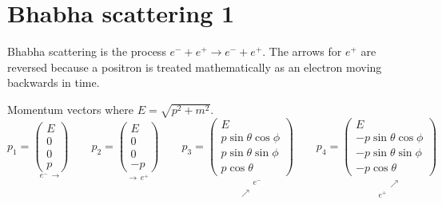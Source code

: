

\section*{Bhabha scattering 1}

Bhabha scattering is the process $e^-+e^+\rightarrow e^-+e^+$.
The arrows for $e^+$ are reversed because a positron is treated
mathematically as an electron moving backwards in time.

\begin{center}
\end{center}

Momentum vectors where $E=\sqrt{p^2+m^2}$.
\begin{equation*}
p_1=\underset{e^- \, \longrightarrow}
{\begin{pmatrix}E\\0\\0\\p\end{pmatrix}}
\qquad
p_2=\underset{\longrightarrow \, e^+}
{\begin{pmatrix}E\\0\\0\\-p\end{pmatrix}}
\qquad
p_3=\underset{\substack{\phantom{\nearrow} \, e^-\\\nearrow \, \phantom{e^-}}}
{\begin{pmatrix}E\\p\sin\theta\cos\phi\\p\sin\theta\sin\phi\\p\cos\theta\end{pmatrix}}
\qquad
p_4=\underset{\substack{\phantom{e^+} \, \nearrow\\e^+ \, \phantom{\nearrow}}}
{\begin{pmatrix}E\\-p\sin\theta\cos\phi\\-p\sin\theta\sin\phi\\-p\cos\theta\end{pmatrix}}
\end{equation*}

